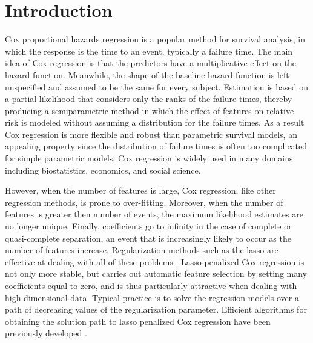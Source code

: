 \label{METHOD2}

\section{Introduction}

Cox proportional hazards regression \citep{cox1972regression} is a popular method for survival analysis, in which the response is the time to an event, typically a failure time. The main idea of Cox regression is that the predictors have a multiplicative effect on the hazard function. Meanwhile, the shape of the baseline hazard function is left unspecified and assumed to be the same for every subject. Estimation is based on a partial likelihood that considers only the ranks of the failure times, thereby producing a semiparametric method in which the effect of features on relative risk is modeled without assuming a distribution for the failure times. As a result Cox regression is more flexible and robust than parametric survival models, an appealing property since the distribution of failure times is often too complicated for simple parametric models. Cox regression is widely used in many domains including biostatistics, economics, and social science.

However, when the number of features is large, Cox regression, like other regression methods, is prone to over-fitting. Moreover, when the number of features is greater then number of events, the maximum likelihood estimates are no longer unique. Finally, coefficients go to infinity in the case of complete or quasi-complete separation, an event that is increasingly likely to occur as the number of features increase. Regularization methods such as the lasso are effective at dealing with all of these problems \citep{tibshirani1997lasso}. Lasso penalized Cox regression is not only more stable, but carries out automatic feature selection by setting many coefficients equal to zero, and is thus particularly attractive when dealing with high dimensional data. Typical practice is to solve the regression models over a path of decreasing values of the regularization parameter. Efficient algorithms for obtaining the solution path to lasso penalized Cox regression have been previously developed \citep{simon2011regularization}.

